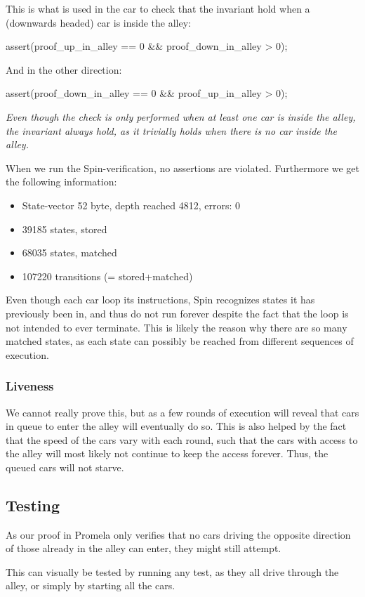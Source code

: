This is what is used in the car  to check that the invariant hold when a (downwards headed) car is inside the alley:
\begin{promela}
assert(proof_up_in_alley == 0 && proof_down_in_alley > 0);
\end{promela}

And in the other direction:
\begin{promela}
assert(proof_down_in_alley == 0 && proof_up_in_alley > 0);
\end{promela}


\emph{Even though the check is only performed when at least one car is inside the alley, the invariant always hold, as it trivially holds when there is no car inside the alley.}

When we run the Spin-verification, no assertions are violated. Furthermore we get the following information:

\begin{itemize}
	\item State-vector 52 byte, depth reached 4812, errors: 0
	\item 39185 states, stored
	\item 68035 states, matched
	\item 107220 transitions (= stored+matched)
\end{itemize}

Even though each car loop its instructions, Spin recognizes states it has previously been in, and thus do not run forever despite the fact that the loop is not intended to ever terminate. This is likely the reason why there are so many matched states, as each state can possibly be reached from different sequences of execution.

\subsubsection{Liveness}
We cannot really prove this, but as a few rounds of execution will reveal that cars in queue to enter the alley will eventually do so. This is also helped by the fact that the speed of the cars vary with each round, such that the cars with access to the alley will most likely not continue to keep the access forever. Thus, the queued cars will not starve.


\subsection{Testing}
\label{sub:all-test}
As our proof in Promela only verifies that no cars driving the
opposite direction of those already in the alley can enter, they might
still attempt.

This can visually be tested by running any test, as they all drive through
the alley, or simply by starting all the cars.
